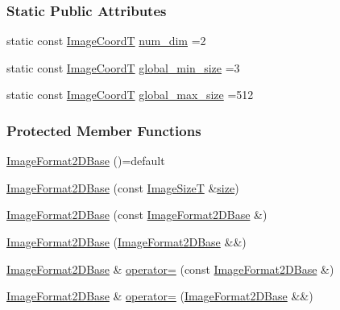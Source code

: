 \subsubsection*{Static Public Attributes}
\begin{DoxyCompactItemize}
\item 
static const \hyperlink{classmappel_1_1ImageFormat2DBase_a45e9234d63c357f34ca56c72c12b9e9c}{Image\+CoordT} \hyperlink{classmappel_1_1ImageFormat2DBase_a9c29fcaf30faffc77b41ba556ebb0127}{num\+\_\+dim} =2
\item 
static const \hyperlink{classmappel_1_1ImageFormat2DBase_a45e9234d63c357f34ca56c72c12b9e9c}{Image\+CoordT} \hyperlink{classmappel_1_1ImageFormat2DBase_a1149e8545d3cfaa40c2f3bc02e3223b2}{global\+\_\+min\+\_\+size} =3
\item 
static const \hyperlink{classmappel_1_1ImageFormat2DBase_a45e9234d63c357f34ca56c72c12b9e9c}{Image\+CoordT} \hyperlink{classmappel_1_1ImageFormat2DBase_a11c9bb87930f597dff17e9923b73bf5e}{global\+\_\+max\+\_\+size} =512
\end{DoxyCompactItemize}
\subsubsection*{Protected Member Functions}
\begin{DoxyCompactItemize}
\item 
\hyperlink{classmappel_1_1ImageFormat2DBase_afc79fd7d2bbbc5672ff3690241c680e0}{Image\+Format2\+D\+Base} ()=default
\item 
\hyperlink{classmappel_1_1ImageFormat2DBase_a86de92208eaeed6f691bf2bceaa8eb08}{Image\+Format2\+D\+Base} (const \hyperlink{classmappel_1_1ImageFormat2DBase_a49cccf61eb2a768a202634d27fcd81d5}{Image\+SizeT} \&\hyperlink{classmappel_1_1ImageFormat2DBase_a3be77d2aa6ec9f3815322732950c2a60}{size})
\item 
\hyperlink{classmappel_1_1ImageFormat2DBase_ab0b17cc722833808a90eb9cbbf1b52ff}{Image\+Format2\+D\+Base} (const \hyperlink{classmappel_1_1ImageFormat2DBase}{Image\+Format2\+D\+Base} \&)
\item 
\hyperlink{classmappel_1_1ImageFormat2DBase_af455479cc5fabbb1fda3dc585ef56b36}{Image\+Format2\+D\+Base} (\hyperlink{classmappel_1_1ImageFormat2DBase}{Image\+Format2\+D\+Base} \&\&)
\item 
\hyperlink{classmappel_1_1ImageFormat2DBase}{Image\+Format2\+D\+Base} \& \hyperlink{classmappel_1_1ImageFormat2DBase_af7abdfaf54b018bc3a4b2a2a4e37b451}{operator=} (const \hyperlink{classmappel_1_1ImageFormat2DBase}{Image\+Format2\+D\+Base} \&)
\item 
\hyperlink{classmappel_1_1ImageFormat2DBase}{Image\+Format2\+D\+Base} \& \hyperlink{classmappel_1_1ImageFormat2DBase_abe5d19d33ba0639b9fbcc0da8bcf4d25}{operator=} (\hyperlink{classmappel_1_1ImageFormat2DBase}{Image\+Format2\+D\+Base} \&\&)
\end{DoxyCompactItemize}
